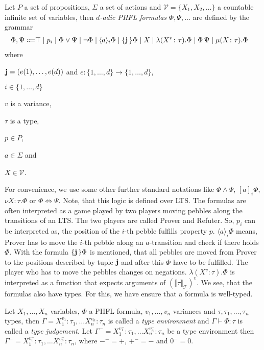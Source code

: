 \begin{definition}
    Let $P$ a set of propositions, $\Sigma$ a set of actions and $\mathcal{V} = \{X_1, X_2, \dots\}$ a countable
    infinite
    set of variables, then
    \emph{$d$-adic PHFL formulas} $\Phi, \Psi,\dots$ are defined by the grammar
    \begin{align*}
        \Phi,\Psi\Coloneqq&\top \mid p_i \mid \Phi \vee \Psi \mid \neg \Phi \mid \langle a \rangle_i \Phi \mid
        \{\emph{j}\,\} \Phi \mid X \mid \lambda (X^v\colon\tau).\Phi \mid \Phi\,\Psi\mid  \mu (X\colon\tau).\Phi
    \end{align*}
    where
    \begin{compactitem}
        \item $\emph{j} = (e(1), \dots, e(d))$ and $e: \{1, \dots, d\} \rightarrow \{1, \dots, d\}$,
        \item $i \in \{1, \dots, d\}$
        \item $v$ is a variance,
        \item $\tau$ is a type,
        \item $p \in P$,
        \item $a \in \Sigma$ and
        \item $X \in \mathcal{V}$.
    \end{compactitem}
\end{definition}

For convenience, we use some other further standard notations like $\Phi \wedge \Psi$, $[a]_i\Phi$, $\nu
X \colon \tau.\Phi$ or $\Phi \Leftrightarrow \Psi$. Note, that this logic is defined over LTS. The formulas are
often interpreted as a game played by two players moving pebbles along the transitions of an LTS. The two players
are called Prover and Refuter. So, $p_i$ can be interpreted as, the position of the $i$-th pebble fulfills
property $p$. $\langle a \rangle_i \Phi$ means, Prover has to move the $i$-th pebble along an $a$-transition and
check if there holds $\Phi$. With the formula $\{\emph{j}\,\} \Phi$ is mentioned, that all pebbles
are moved from Prover to the positions described by tuple $\emph{j}$ and after this $\Phi$ have to
be fulfilled. The player who has to move the pebbles changes on negations. $\lambda (X^v\colon\tau).\Phi$ is
interpreted as a function that expects arguments of $(\llbracket\tau\rrbracket_\mathcal{T})^v$. We see, that the
formulas also have types. For this, we have ensure that a formula is well-typed.

\begin{definition}
    Let $X_1, \dots, X_n$ variables, $\Phi$ a PHFL formula, $v_1, \dots, v_n$ variances and $\tau, \tau_1, \dots,
    \tau_n$ types, then $\Gamma = X_1^{v_1}\colon \tau_1, \dots X_n^{v_n} \colon \tau_n$ is
    called a \emph{type environment} and $\Gamma \vdash \Phi\colon\tau$
    is called a \emph{type judgement}. Let $\Gamma^- = X_1^{v_1^-}\colon \tau_1, \dots
    X_n^{v_n^-} \colon \tau_n$ be a type environment then $\Gamma^- = X_1^{v_1^-}\colon \tau_1, \dots
    X_n^{v_n^-} \colon \tau_n$, where $-^- = +$, $+^- = -$ and $0^- = 0$.
\end{definition}

